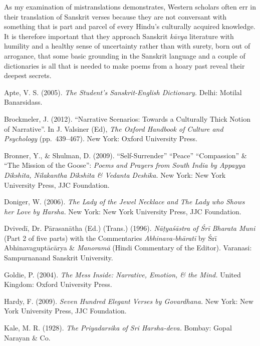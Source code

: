 As my examination of mistranslations demonstrates, Western scholars often err in their translation of Sanskrit verses because they are not conversant with something that is part and parcel of every Hindu’s culturally acquired knowledge. It is therefore important that they approach Sanskrit \textsl{kāvya} literature with humility and a healthy sense of uncertainty rather than with surety, born out of arrogance, that some basic grounding in the Sanskrit language and a couple of dictionaries is all that is needed to make poems from a hoary past reveal their deepest secrets. 

\begin{thebibliography}{99}
\itemsep=2pt
Apte, V. S. (2005). \textsl{The Student’s Sanskrit-English Dictionary.} Delhi: Motilal Banarsidass.

Brockmeler, J. (2012). “Narrative Scenarios: Towards a Culturally Thick Notion of Narrative”. In J. Valsiner (Ed), \textsl{The Oxford Handbook of Culture and Psychology} (pp.~439--467). New York: Oxford University Press.

Bronner, Y., \& Shulman, D. (2009). “Self-Surrender” “Peace” “Compassion” \& “The Mission of the Goose”: \textsl{Poems and Prayers from South India by Appayya Dikshita, Nilakantha Dikshita \& Vedanta Deshika.} New York: New York University Press, JJC Foundation.

Doniger, W. (2006). \textsl{The Lady of the Jewel Necklace and The Lady who Shows her Love by Harsha.} New York: New York University Press, JJC Foundation.

Dvivedī, Dr. Pārasanātha (Ed.) (Trans.) (1996). \textsl{Nāṭyaśāstra of Śrī Bharata Muni} (Part 2 of five parts) with the Commentaries  \textsl{Abhinava-bhāratī} by Śrī Abhinavaguptācārya \& \textsl{Manoramā} (Hindi Commentary of the Editor). Varanasi: Sampurnanand Sanskrit University.

Goldie, P. (2004). \textsl{The Mess Inside: Narrative, Emotion, \& the Mind.} United Kingdom: Oxford University Press.

Hardy, F. (2009). \textsl{Seven Hundred Elegant Verses by Govardhana.} New York: New York University Press, JJC Foundation.

Kale, M. R. (1928). \textsl{The Priyadarsika of Sri Harsha-deva.} Bombay: Gopal Narayan \& Co.


\end{thebibliography}
